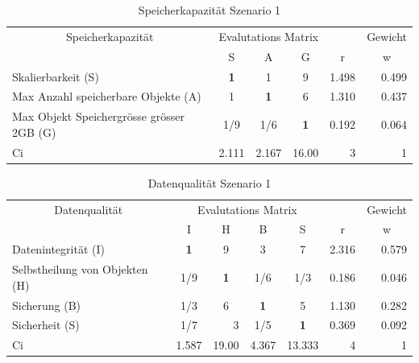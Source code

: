 \begin{table}[htbp]
\caption{Speicherkapazität Szenario 1}
\begin{tabular}{|p{7.1cm}|c|c|c|r|r|}
\hline
\multicolumn{ 1}{|c|}{Speicherkapazität } & \multicolumn{ 3}{c|}{Evalutations Matrix} & \multicolumn{1}{l|}{} & \multicolumn{1}{l|}{Gewicht} \\ \cline{ 2- 6}
\multicolumn{ 1}{|c|}{} & S & A & G & \multicolumn{1}{c|}{r} & \multicolumn{1}{c|}{w} \\ \hline
Skalierbarkeit (S) & \textbf{1} & 1 & 9 & 1.498 & 0.499 \\ \hline
Max Anzahl speicherbare Objekte (A) & 1 & \textbf{1} & 6 & 1.310 & 0.437 \\ \hline
Max Objekt Speichergrösse grösser 2GB (G) &  1/9 &  1/6 & \textbf{1} & 0.192 & 0.064 \\ \hline \hline
Ci & \multicolumn{1}{r|}{2.111} & \multicolumn{1}{r|}{2.167} & \multicolumn{1}{r|}{16.00} & 3 & 1 \\ \hline
\end{tabular}
\label{AHPSpeicherkapazitätS1}
\end{table}


\begin{table}[htbp]
\caption{Datenqualität Szenario 1}
\begin{tabular}{|l|c|c|c|c|r|r|}
\hline
\multicolumn{ 1}{|c|}{Datenqualität} & \multicolumn{ 4}{c|}{Evalutations Matrix} & \multicolumn{1}{l|}{} & \multicolumn{1}{l|}{Gewicht} \\ \cline{ 2- 7}
\multicolumn{ 1}{|c|}{} & I & H & B & S & \multicolumn{1}{c|}{r} & \multicolumn{1}{c|}{w} \\ \hline
Datenintegrität (I) & \textbf{1} & 9 & 3 & 7 & 2.316 & 0.579 \\ \hline
Selbstheilung von Objekten (H) &  1/9 & \textbf{1} &  1/6 &  1/3 & 0.186 & 0.046 \\ \hline
Sicherung (B) &  1/3 & 6 & \textbf{1} & 5 & 1.130 & 0.282 \\ \hline
Sicherheit (S) &  1/7 & \multicolumn{1}{r|}{3    } &  1/5 & \textbf{1} & 0.369 & 0.092 \\ \hline  \hline
Ci & \multicolumn{1}{r|}{1.587} & \multicolumn{1}{r|}{19.00} & \multicolumn{1}{r|}{4.367} & \multicolumn{1}{r|}{13.333} & 4 & 1 \\ \hline
\end{tabular}
\label{AHPDatenqualitätS1}
\end{table}

